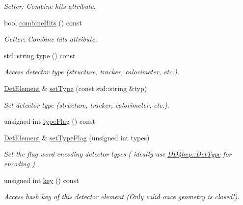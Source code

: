 \begin{DoxyCompactItemize}
\begin{DoxyCompactList}\small\item\em Setter: Combine hits attribute. \item\end{DoxyCompactList}\item 
bool \hyperlink{class_d_d4hep_1_1_geometry_1_1_det_element_a64ef93ecc75518cc2d78a6ca0b64d48d}{combineHits} () const 
\begin{DoxyCompactList}\small\item\em Getter: Combine hits attribute. \item\end{DoxyCompactList}\item 
std::string \hyperlink{class_d_d4hep_1_1_geometry_1_1_det_element_ac3f1002c4b640a796ebd1854507496ac}{type} () const 
\begin{DoxyCompactList}\small\item\em Access detector type (structure, tracker, calorimeter, etc.). \item\end{DoxyCompactList}\item 
\hyperlink{class_d_d4hep_1_1_geometry_1_1_det_element}{DetElement} \& \hyperlink{class_d_d4hep_1_1_geometry_1_1_det_element_a28c2c203dfcb6cd893bbe1bec4101392}{setType} (const std::string \&typ)
\begin{DoxyCompactList}\small\item\em Set detector type (structure, tracker, calorimeter, etc.). \item\end{DoxyCompactList}\item 
unsigned int \hyperlink{class_d_d4hep_1_1_geometry_1_1_det_element_a7c6acb468c40a967e9e50a8efc2a620d}{typeFlag} () const 
\item 
\hyperlink{class_d_d4hep_1_1_geometry_1_1_det_element}{DetElement} \& \hyperlink{class_d_d4hep_1_1_geometry_1_1_det_element_a5a03e88dd7e1e3f215116f44dfca1dce}{setTypeFlag} (unsigned int types)
\begin{DoxyCompactList}\small\item\em Set the flag word encoding detector types ( ideally use \hyperlink{class_d_d4hep_1_1_det_type}{DD4hep::DetType} for encoding ). \item\end{DoxyCompactList}\item 
unsigned int \hyperlink{class_d_d4hep_1_1_geometry_1_1_det_element_ad3a90491007d6e3d4656b33d09466b07}{key} () const 
\begin{DoxyCompactList}\small\item\em Access hash key of this detector element (Only valid once geometry is closed!). \item\end{DoxyCompactList}\item 

\end{DoxyCompactItemize}
